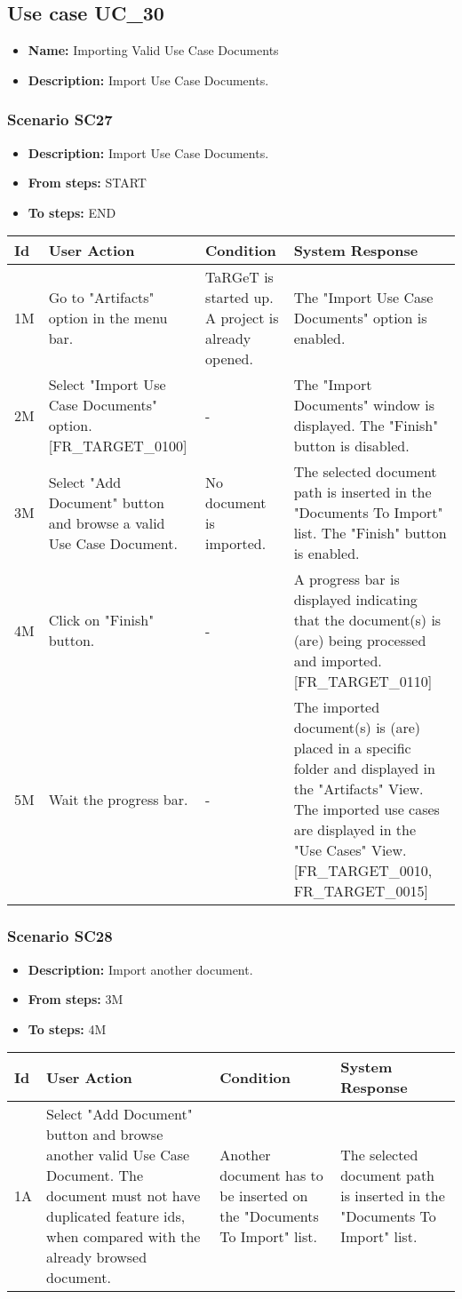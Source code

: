 \documentclass[a4paper,11pt]{article}
\newcommand{\bl}{\\ \hline}
\begin{document}
\subsection*{Use case UC_30}
\begin{itemize}
\item {\bf Name: }Importing Valid Use Case Documents
\item {\bf Description: } Import Use Case Documents.
\end{itemize}
\subsubsection*{Scenario SC27}
\begin{itemize}
\item {\bf Description:} Import Use Case Documents.
\item {\bf From steps:} START
\item {\bf To steps:} END
\end{itemize}
\begin{tabular}{|p{0.4in}|p{1.5in}|p{1.5in}|p{1.5in}|}
\hline
Id & User Action & Condition & System Response \bl 
1M & Go to "Artifacts" option in the menu bar. & TaRGeT is started up. A project is already opened.
					 & The "Import Use Case Documents" option is enabled.
					\bl
2M & Select "Import Use Case Documents" option. [FR_TARGET_0100]
					 & - & The "Import Documents" window is displayed. The "Finish"
						button is disabled. \bl
3M & Select "Add Document" button and browse a valid Use Case
						Document.  & No document is imported. & The selected document path is inserted in the "Documents
						To Import" list. The "Finish" button is enabled.\bl
4M & Click on "Finish" button. & - & A progress bar is displayed indicating that the
						document(s) is (are) being processed and imported.[FR_TARGET_0110]
					\bl
5M & Wait the progress bar.  & - & The imported document(s) is (are) placed in a specific
						folder and displayed in the "Artifacts" View. The imported use
						cases are displayed in the "Use Cases" View. [FR_TARGET_0010,
						FR_TARGET_0015]\bl
\end{tabular}
\subsubsection*{Scenario SC28}
\begin{itemize}
\item {\bf Description:} Import another document.
\item {\bf From steps:} 3M
\item {\bf To steps:} 4M
\end{itemize}
\begin{tabular}{|p{0.4in}|p{1.5in}|p{1.5in}|p{1.5in}|}
\hline
Id & User Action & Condition & System Response \bl 
1A & Select "Add Document" button and browse another valid Use
						Case Document. The document must not have duplicated feature ids,
						when compared with the already browsed document.  & Another document has to be inserted on the "Documents To
						Import" list. & The selected document path is inserted in the "Documents
						To Import" list.\bl
\end{tabular}
\end{document}
